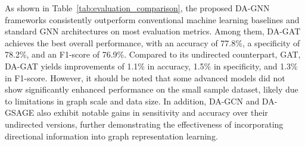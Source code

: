 \documentclass[lettersize,journal]{IEEEtran}
\begin{document}
\begin{table}[htbp]
\centering
\caption{Performance Comparison of AD Detection}
\label{tab:evaluation_comparison}
\renewcommand{\arraystretch}{1.3}
\vspace{1mm}
\end{table}



As shown in Table~\ref{tab:evaluation_comparison}, the proposed DA-GNN frameworks consistently outperform conventional machine learning baselines and standard GNN architectures on most evaluation metrics.
Among them, DA-GAT achieves the best overall performance, with an accuracy of 77.8\%, a specificity of 78.2\%, and an F1-score of 76.9\%. Compared to its undirected counterpart, GAT, DA-GAT yields improvements of 1.1\% in accuracy, 1.5\% in specificity, and 1.3\% in F1-score. However, it should be noted that some advanced models did not show significantly enhanced performance on the small sample dataset, likely due to limitations in graph scale and data size. 
In addition, DA-GCN and DA-GSAGE also exhibit notable gains in sensitivity and accuracy over their undirected versions, further demonstrating the effectiveness of incorporating directional information into graph representation learning.
\end{document}
